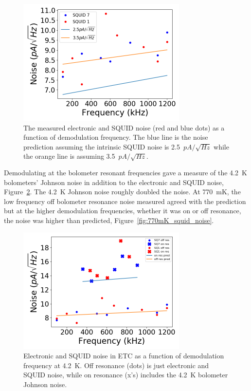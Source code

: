 \begin{figure}[ht!]
\begin{center}
\includegraphics[height=2.5in]{figures/adjusting_squid_noise.png}
\caption{The measured electronic and \ac{SQUID} noise (red and blue dots) as a function of demodulation frequency. The blue line is the noise prediction assuming the intrinsic \ac{SQUID} noise is 2.5~$pA/\sqrt{Hz}$ while the orange line is assuming 3.5~$pA/\sqrt{Hz}$.  
\label{fig:adjust_squid} }
\end{center}
\end{figure}



Demodulating at the bolometer resonant frequencies gave a measure of the 4.2~K bolometers' Johnson noise in addition to the electronic and \ac{SQUID} noise, Figure~\ref{fig:dark_squid_noise}. 
The 4.2~K Johnson noise roughly doubled the noise.
At 770~mK, the low frequency off bolometer resonance noise measured agreed with the prediction but at the higher demodulation frequencies, whether it was on or off resonance, the noise was higher than predicted, Figure~\ref{fig:770mK_squid_noise}. 



\begin{figure}[ht!]
\begin{center}
\includegraphics[height=2.5in]{figures/squid_plus_electronic_noise.png}
\caption{Electronic and \ac{SQUID} noise in \ac{ETC} as a function of demodulation frequency at 4.2~K. Off resonance (dots) is just electronic and \ac{SQUID} noise, while on resonance (x's) includes the 4.2~K bolometer Johnson noise. 
\label{fig:dark_squid_noise} }
\end{center}
\end{figure}

